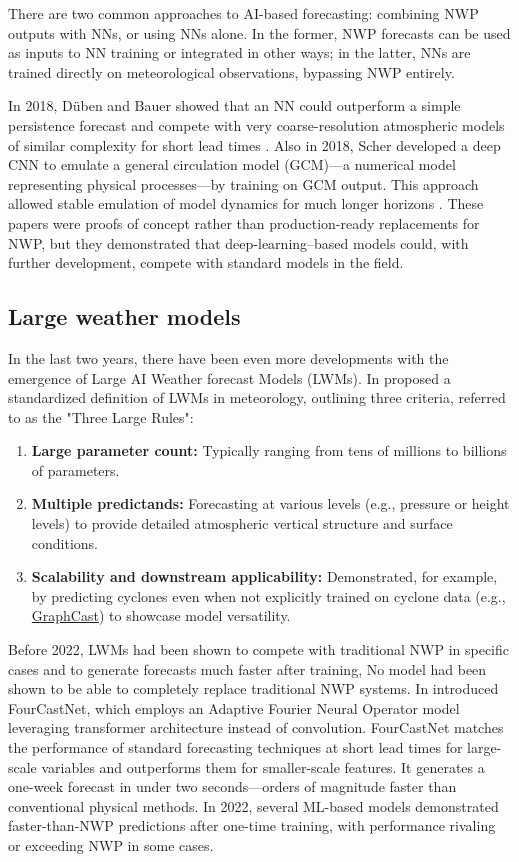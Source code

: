 There are two common approaches to AI-based forecasting: combining NWP outputs with NNs, or using NNs alone. In the former, NWP forecasts can be used as inputs to NN training or integrated in other ways; in the latter, NNs are trained directly on meteorological observations, bypassing NWP entirely.

In 2018, Düben and Bauer showed that an NN could outperform a simple persistence forecast and compete with very coarse-resolution atmospheric models of similar complexity for short lead times \parencite{dueben2018}. Also in 2018, Scher developed a deep CNN to emulate a general circulation model (GCM)—a numerical model representing physical processes—by training on GCM output. This approach allowed stable emulation of model dynamics for much longer horizons \parencite{scher2018}. These papers were proofs of concept rather than production-ready replacements for NWP, but they demonstrated that deep-learning–based models could, with further development, compete with standard models in the field.

\subsection{Large weather models}
In the last two years, there have been even more developments with the emergence of Large AI Weather forecast Models (LWMs). In \cite{SecondRevolution} proposed a standardized definition of LWMs in meteorology, outlining three criteria, referred to as the "Three Large Rules":

\begin{enumerate}[label=\textbf{\arabic*}.,rightmargin=1.5em]
  \item \textbf{Large parameter count:} Typically ranging from tens of millions to billions of parameters.
  \item \textbf{Multiple predictands:} Forecasting at various levels (e.g., pressure or height levels) to provide detailed atmospheric vertical structure and surface conditions.
  \item \textbf{Scalability and downstream applicability:} Demonstrated, for example, by predicting cyclones even when not explicitly trained on cyclone data (e.g., \href{https://www.youtube.com/watch?v=PD1v5PCJs_o&ab_channel=GregBronevetsky}{GraphCast}) to showcase model versatility.
\end{enumerate}

Before 2022, LWMs had been shown to compete with traditional NWP in specific cases and to generate forecasts much faster after training, No model had been shown to be able to completely replace traditional NWP systems. In \cite{FourCastNet} introduced FourCastNet, which employs an Adaptive Fourier Neural Operator model leveraging transformer architecture instead of convolution. FourCastNet matches the performance of standard forecasting techniques at short lead times for large-scale variables and outperforms them for smaller-scale features. It generates a one-week forecast in under two seconds—orders of magnitude faster than conventional physical methods. In 2022, several ML-based models demonstrated faster-than-NWP predictions after one-time training, with performance rivaling or exceeding NWP in some cases.

